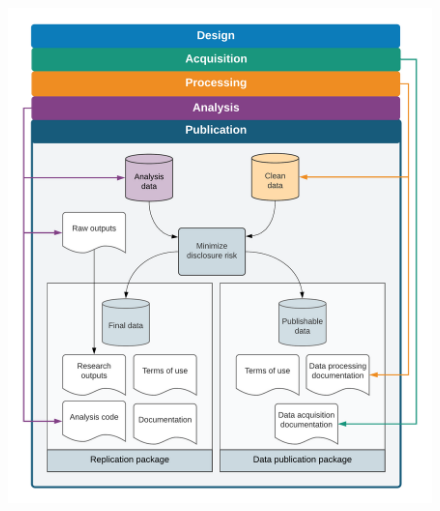 \begin{fullwidth}
	\begin{figure}
		\centering
		\includegraphics[width=1.5\linewidth]{diagrams/Publication}
		\label{fig:publication}
	\end{figure}
\end{fullwidth}

